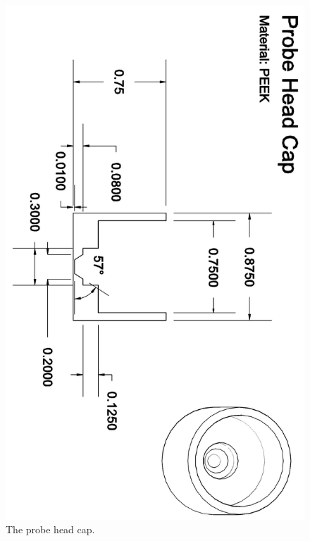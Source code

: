 \documentclass[../PaulGanssle-Thesis.tex]{subfiles}
\begin{document}
\begin{figure}[p]
\centering
\includegraphics[height=0.95\textheight]{appendices/blueprints/ProbeHeadCap.png}
\caption{The probe head cap.}
\label{blueprints:ProbeHeadCap}
\end{figure}
\end{document}
